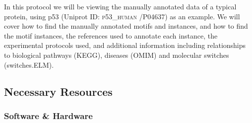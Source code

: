 \documentclass[12pt]{article}
\newcounter{proto}
\newcommand\uniprot[1]{%
	\textsc{\lowercase{#1}}{}%
}
\begin{document}
In this protocol we will be viewing the manually annotated data of a
typical protein, using p53 (Uniprot ID: \uniprot{P53\_HUMAN}/P04637) as an
example. We will cover how to find the manually annotated motifs and instances,
and how to find the motif instances, the references used to annotate each
instance, the experimental protocols used, and additional information including
relationships to biological pathways (KEGG), diseases (OMIM) and molecular
switches (switches.ELM).

%
%
\subsection*{Necessary Resources}
\subsubsection*{Software \& Hardware}

\end{document}
